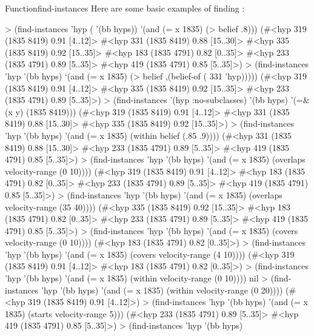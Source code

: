\documentclass[10pt,twoside,english,pdftex]{article}
\begin{document}
\begin{functiondoc}{Function}{find-instances}
\fnexamples
{}%
%
%
Here are some basic examples of finding  :
%
\W\supp
\begin{example}
  > (find-instances 'hyp ( '(bb hyps)) 
      '(and (= x 1835) (> belief .8)))
  (#<hyp 319 (1835 8419) 0.91 [4..12]>
   #<hyp 331 (1835 8419) 0.88 [15..30]>
   #<hyp 335 (1835 8419) 0.92 [15..35]>
   #<hyp 183 (1835 4791) 0.82 [0..35]>
   #<hyp 233 (1835 4791) 0.89 [5..35]>
   #<hyp 419 (1835 4791) 0.85 [5..35]>)\goodpagebreak
  > (find-instances 'hyp '(bb hyps)
      `(and (= x 1835) 
            (> belief ,(belief-of ( 331 'hyp)))))
  (#<hyp 319 (1835 8419) 0.91 [4..12]>
   #<hyp 335 (1835 8419) 0.92 [15..35]>
   #<hyp 233 (1835 4791) 0.89 [5..35]>)\goodpagebreak
  > (find-instances '(hyp :no-subclasses) '(bb hyps)
      '(=\& (x y) (1835 8419)))
  (#<hyp 319 (1835 8419) 0.91 [4..12]>
   #<hyp 331 (1835 8419) 0.88 [15..30]>
   #<hyp 335 (1835 8419) 0.92 [15..35]>)\goodpagebreak
  > (find-instances 'hyp '(bb hyps) 
      '(and (= x 1835) (within belief (.85 .9))))
  (#<hyp 331 (1835 8419) 0.88 [15..30]>
   #<hyp 233 (1835 4791) 0.89 [5..35]>
   #<hyp 419 (1835 4791) 0.85 [5..35]>)\goodpagebreak
  > (find-instances 'hyp '(bb hyps) 
      '(and (= x 1835) (overlaps velocity-range (0 10))))
  (#<hyp 319 (1835 8419) 0.91 [4..12]>
   #<hyp 183 (1835 4791) 0.82 [0..35]>
   #<hyp 233 (1835 4791) 0.89 [5..35]>
   #<hyp 419 (1835 4791) 0.85 [5..35]>)\goodpagebreak
  > (find-instances 'hyp '(bb hyps) 
      '(and (= x 1835) (overlaps velocity-range (35 40))))
  (#<hyp 335 (1835 8419) 0.92 [15..35]>
   #<hyp 183 (1835 4791) 0.82 [0..35]>
   #<hyp 233 (1835 4791) 0.89 [5..35]>
   #<hyp 419 (1835 4791) 0.85 [5..35]>)\goodpagebreak
  > (find-instances 'hyp '(bb hyps) 
      '(and (= x 1835) (covers velocity-range (0 10))))
  (#<hyp 183 (1835 4791) 0.82 [0..35]>)
  > (find-instances 'hyp '(bb hyps) 
      '(and (= x 1835) (covers velocity-range (4 10))))
  (#<hyp 319 (1835 8419) 0.91 [4..12]>
   #<hyp 183 (1835 4791) 0.82 [0..35]>)\goodpagebreak
  > (find-instances 'hyp '(bb hyps) 
      '(and (= x 1835) (within velocity-range (0 10))))
  nil
  > (find-instances 'hyp '(bb hyps) 
      '(and (= x 1835) (within velocity-range (0 20))))
  (#<hyp 319 (1835 8419) 0.91 [4..12]>)\goodpagebreak
  > (find-instances 'hyp '(bb hyps) 
      '(and (= x 1835) (starts velocity-range 5)))
  (#<hyp 233 (1835 4791) 0.89 [5..35]>
   #<hyp 419 (1835 4791) 0.85 [5..35]>)\goodpagebreak
  > (find-instances 'hyp '(bb hyps) 

\end{example}
\end{functiondoc}
\end{document}
